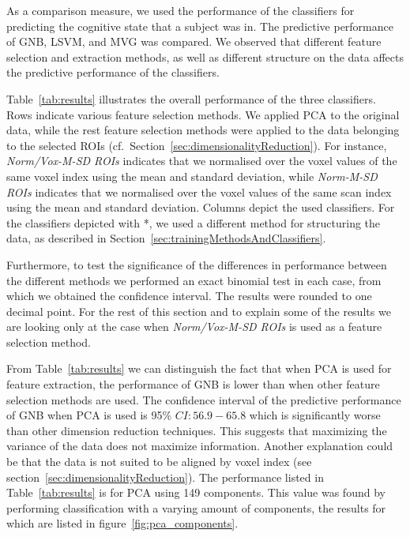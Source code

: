 \documentclass[preprint,journal,11pt]{vgtc}
\begin{document}
As a comparison measure, we used the performance of the classifiers for predicting the cognitive state that a subject was in. The predictive performance of GNB, LSVM, and MVG was compared. We observed that different feature selection and extraction methods, as well as different structure on the data affects the predictive performance of the classifiers.

Table~\ref{tab:results} illustrates the overall performance of the three classifiers. Rows indicate various feature selection methods. We applied PCA to the original data, while the rest feature selection methods were applied to the data belonging to the selected ROIs (cf.~Section~\ref{sec:dimensionalityReduction}). For instance, \emph{Norm/Vox-M-SD ROIs} indicates that we normalised over the voxel values of the same voxel index using the mean and standard deviation, while \emph{Norm-M-SD ROIs} indicates that we normalised over the voxel values of the same scan index using the mean and standard deviation. Columns depict the used classifiers. For the classifiers depicted with *, we used a different method for structuring the data, as described in Section~\ref{sec:trainingMethodsAndClassifiers}.

Furthermore, to test the significance of the differences in performance between the different methods we performed an exact binomial test in each case, from which we obtained the confidence interval. The results were rounded to one decimal point. For the rest of this section and to explain some of the results we are looking only at the case when \emph{Norm/Vox-M-SD ROIs} is used as a feature selection method.

From Table~\ref{tab:results} we can distinguish the fact that when PCA is used for feature extraction, the performance of GNB is lower than when other feature selection methods are used. The confidence interval of the predictive performance of GNB when PCA is used is 95\% $CI: 56.9 - 65.8$ which is significantly worse than other dimension reduction techniques. This suggests that maximizing the variance of the data does not maximize information. Another explanation could be that the data is not suited to be aligned by voxel index (see section~\ref{sec:dimensionalityReduction}). The performance listed in Table~\ref{tab:results} is for PCA using 149 components. This value was found by performing classification with a varying amount of components, the results for which are listed in figure~\ref{fig:pca_components}.
\end{document}
